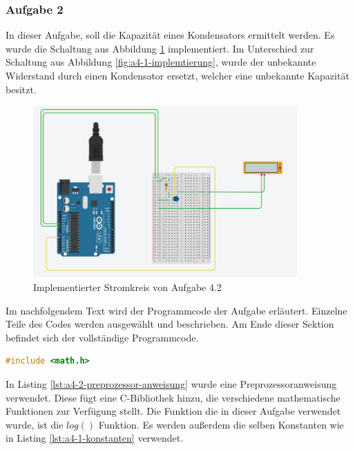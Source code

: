 \subsubsection{Aufgabe 2}

In dieser Aufgabe, soll die Kapazität eines Kondensators ermittelt werden.
Es wurde die Schaltung aus Abbildung \ref{fig:implementierung-aufgabe-4-2} implementiert.
Im Unterschied zur Schaltung aus Abbildung \ref{fig:a4-1-implemtierung}, wurde der unbekannte Widerstand durch einen Kondensator ersetzt, welcher eine unbekannte Kapazität besitzt.

\begin{figure}[h]
    \centering
    \includegraphics[width=0.9\textwidth]{pictures/a4-2-pratik.png}
    \caption{Implementierter Stromkreis von Aufgabe 4.2}
    \label{fig:implementierung-aufgabe-4-2}
\end{figure}

Im nachfolgendem Text wird der Programmcode der Aufgabe erläutert.
Einzelne Teile des Codes werden ausgewählt und beschrieben.
Am Ende dieser Sektion befindet sich der vollständige Programmcode.

\begin{lstlisting}[language=C,label={lst:a4-2-preprozessor-anweisung}, caption={Preprozessoranweisung}]
#include <math.h>
\end{lstlisting}

\newpage

In Listing \ref{lst:a4-2-preprozessor-anweisung} wurde eine Preprozessoranweisung verwendet.
Diese fügt eine C-Bibliothek hinzu, die verschiedene mathematische Funktionen zur Verfügung stellt.
Die Funktion die in dieser Aufgabe verwendet wurde, ist die $log()$ Funktion.
Es werden außerdem die selben Konstanten wie in Listing \ref{lst:a4-1-konstanten} verwendet.

